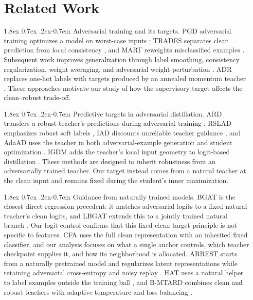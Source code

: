 \documentclass{article} %
\makeatletter
\theoremstyle{plain}
\renewcommand{\paragraph}{\@startsection{paragraph}{4}{\z@}%
  {1.8ex \@plus 0.7ex \@minus .2ex}{-0.7em}%
  {\normalfont\normalsize\bfseries}}
\makeatother
\begin{document}
\section{Related Work}
\label{sec:related}

\paragraph{Adversarial training and its targets.}
PGD adversarial training optimizes a model on worst-case inputs \citep{PGD}; TRADES separates clean
prediction from local consistency \citep{TRADES}, and MART reweights misclassified examples
\citep{MART}. Subsequent work improves generalization through label smoothing, consistency
regularization, weight averaging, and adversarial weight perturbation
\citep{pang2020bag,tack2022consistency,robustoverfit,2020_awp}. ADR replaces one-hot labels with
targets produced by an annealed momentum teacher \citep{adr}. These approaches motivate our study
of how the supervisory target affects the clean--robust trade-off.

\paragraph{Predictive targets in adversarial distillation.}
ARD transfers a robust teacher's predictions during adversarial training \citep{ard}. RSLAD emphasizes
robust soft labels \citep{rslad}, IAD discounts unreliable teacher guidance \citep{iad}, and AdaAD uses
the teacher in both adversarial-example generation and student optimization \citep{adaad}. IGDM adds
the teacher's local input geometry to logit-based distillation \citep{igdm}. These methods are designed
to inherit robustness from an adversarially trained teacher. Our target instead comes from a natural
teacher at the clean input and remains fixed during the student's inner maximization.

\paragraph{Guidance from naturally trained models.}
BGAT is the closest direct-regression precedent: it matches adversarial logits to a fixed natural
teacher's clean logits, and LBGAT extends this to a jointly trained natural branch \citep{lbgat}.
Our logit control confirms that this fixed-clean-target principle is not specific to features. CFA
uses the full clean representation with an inherited fixed classifier, and our analysis focuses on
what a single anchor controls, which teacher checkpoint supplies it, and how its neighborhood is
allocated. ARREST starts
from a naturally pretrained model and regularizes latent representations while retaining adversarial
cross-entropy and noisy replay \citep{arrest}. HAT uses a natural helper to label examples outside the
training ball \citep{hat}, and B-MTARD combines clean and robust teachers with adaptive temperature
and loss balancing \citep{bmtard}.
\end{document}
